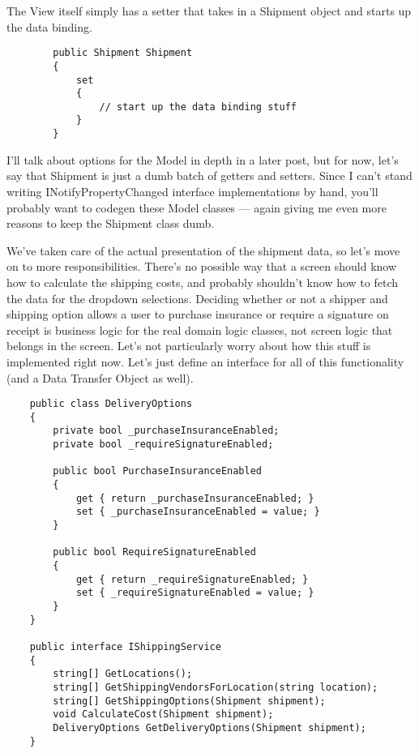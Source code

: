 \documentclass{article}
\begin{document}
{The View itself simply has a setter that takes in a Shipment object and starts up the data binding. 
\begin{lstlisting}
        public Shipment Shipment
        {
            set
            {
                // start up the data binding stuff
            }
        }
\end{lstlisting}		

I'll talk about options for the Model in depth in a later post, but for now, let's say that Shipment is just a dumb batch of getters and setters.  Since I can't stand writing INotifyPropertyChanged interface implementations by hand, you'll probably want to codegen these Model classes — again giving me even more reasons to keep the Shipment class dumb.

We've taken care of the actual presentation of the shipment data, so let's move on to more responsibilities.  There's no possible way that a screen should know how to calculate the shipping costs, and probably shouldn't know how to fetch the data for the dropdown selections.  Deciding whether or not a shipper and shipping option allows a user to purchase insurance or require a signature on receipt is business logic for the real domain logic classes, not screen logic that belongs in the screen.  Let's not particularly worry about how this stuff is implemented right now.  Let's just define an interface for all of this functionality (and a Data Transfer Object as well).

\begin{lstlisting}
    public class DeliveryOptions
    {
        private bool _purchaseInsuranceEnabled;
        private bool _requireSignatureEnabled; 

        public bool PurchaseInsuranceEnabled
        {
            get { return _purchaseInsuranceEnabled; }
            set { _purchaseInsuranceEnabled = value; }
        } 

        public bool RequireSignatureEnabled
        {
            get { return _requireSignatureEnabled; }
            set { _requireSignatureEnabled = value; }
        }
    } 

    public interface IShippingService
    {
        string[] GetLocations();
        string[] GetShippingVendorsForLocation(string location);
        string[] GetShippingOptions(Shipment shipment);
        void CalculateCost(Shipment shipment);
        DeliveryOptions GetDeliveryOptions(Shipment shipment);
    }
\end{lstlisting}	

}
\end{document}
